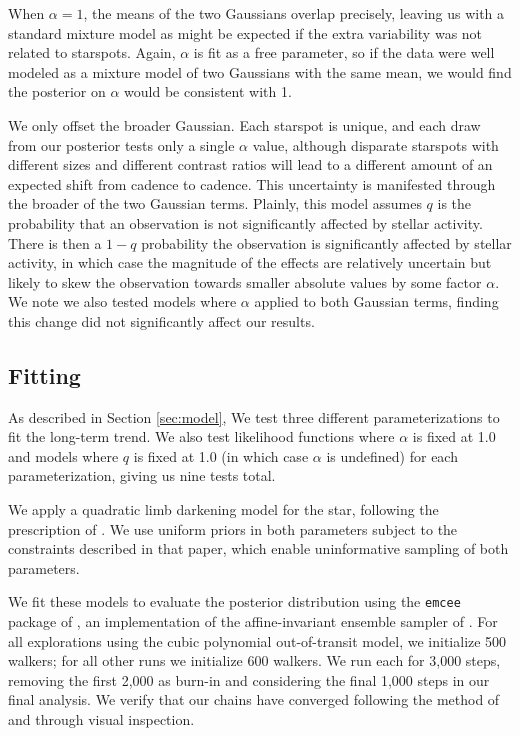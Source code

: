 \documentclass[twocolumn]{aastex63}
\begin{document}
When $\alpha = 1$, the means of the two Gaussians overlap precisely, leaving us with a standard mixture model as might be expected if the extra variability was not related to starspots. Again, $\alpha$ is fit as a free parameter, so if the data were well modeled as a mixture model of two Gaussians with the same mean, we would find the posterior on $\alpha$ would be consistent with 1.

We only offset the broader Gaussian. Each starspot is unique, and each draw from our posterior tests only a single $\alpha$ value, although disparate starspots with different sizes and different contrast ratios will lead to a different amount of an expected shift from cadence to cadence. 
This uncertainty is manifested through the broader of the two Gaussian terms.
Plainly, this model assumes $q$ is the probability that an observation is not significantly affected by stellar activity. There is then a $1-q$ probability the observation is significantly affected by stellar activity, in which case the magnitude of the effects are relatively uncertain but likely to skew the observation towards smaller absolute values by some factor $\alpha$.
We note we also tested models where $\alpha$ applied to both Gaussian terms, finding this change did not significantly affect our results.





\subsection{Fitting}

As described in Section \ref{sec:model}, We test three different parameterizations to fit the long-term trend. 
We also test likelihood functions where $\alpha$ is fixed at 1.0 and models where $q$ is fixed at 1.0 (in which case $\alpha$ is undefined) for each parameterization, giving us nine tests total.

We apply a quadratic limb darkening model for the star, following the prescription of \citet{Kipping13b}. We use uniform priors in both parameters subject to the constraints described in that paper, which enable uninformative sampling of both parameters.

We fit these models to evaluate the posterior distribution using the \texttt{emcee} package of \citet{Foreman-Mackey12}, an implementation of the affine-invariant ensemble sampler of \citet{Goodman10}.
For all explorations using the cubic polynomial out-of-transit model, we initialize 500 walkers; for all other runs we initialize 600 walkers. 
We run each for 3,000 steps, removing the first 2,000 as burn-in and considering the final 1,000 steps in our final analysis. 
We verify that our chains have converged following the method of \citet{Geweke92} and through visual inspection.
\end{document}
